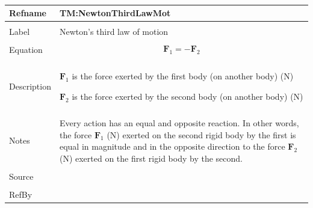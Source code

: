 \documentclass[12pt]{article}
\begin{document}
~\newline
 \noindent \begin{minipage}{\textwidth}
\begin{tabular}{p{} p{}}
\toprule \textbf{Refname} & \textbf{TM:NewtonThirdLawMot}
\label{TM:NewtonThirdLawMot}
\\ \midrule \\
Label & Newton's third law of motion
        \\ \midrule \\
        Equation & \begin{displaymath}
                   {\mathbf{F}_{1}}=-{\mathbf{F}_{2}}
                   \end{displaymath}
                   \\ \midrule \\
                   Description & \begin{symbDescription}
                                 \item{${\mathbf{F}_{1}}$ is the force exerted by the first body (on another body) (N)}
                                 \item{${\mathbf{F}_{2}}$ is the force exerted by the second body (on another body) (N)}
                                 \end{symbDescription}
                                 \\ \midrule \\
                                 Notes & Every action has an equal and opposite reaction. In other words, the force ${\mathbf{F}_{1}}$ (N) exerted on the second rigid body by the first is equal in magnitude and in the opposite direction to the force ${\mathbf{F}_{2}}$ (N) exerted on the first rigid body by the second.
                                         \\ \midrule \\
                                         Source & \\ \midrule \\
                                                  RefBy & 
\\ \bottomrule \end{tabular}
\end{minipage}\\
~\newline
\end{document}
